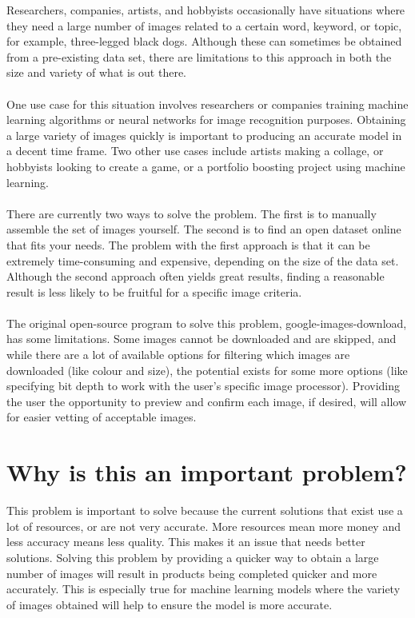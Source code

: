 \documentclass{article}
\begin{document}
Researchers, companies, artists, and hobbyists occasionally have situations where they need a large number of images related to a certain word, keyword, or topic, for example, three-legged black dogs. Although these can sometimes be obtained from a pre-existing data set, there are limitations to this approach in both the size and variety of what is out there.
\\\\One use case for this situation involves researchers or companies training machine learning algorithms or neural networks for image recognition purposes. Obtaining a large variety of images quickly is important to producing an accurate model in a decent time frame. Two other use cases include artists making a collage, or hobbyists looking to create a game, or a portfolio boosting project using machine learning.
\\\\There are currently two ways to solve the problem. The first is to manually assemble the set of images yourself. The second is to find an open dataset online that fits your needs. The problem with the first approach is that it can be extremely time-consuming and expensive, depending on the size of the data set. Although the second approach often yields great results, finding a reasonable result is less likely to be fruitful for a specific image criteria.
\\\\The original open-source program to solve this problem, google-images-download, has some limitations. Some images cannot be downloaded and are skipped, and while there are a lot of available options for filtering which images are downloaded (like colour and size), the potential exists for some more options (like specifying bit depth to work with the user’s specific image processor). Providing the user the opportunity to preview and confirm each image, if desired, will allow for easier vetting of acceptable images.


\section* {Why is this an important problem?}

This problem is important to solve because the current solutions that exist use a lot of resources, or are not very accurate. More resources mean more money and less accuracy means less quality. This makes it an issue that needs better solutions. Solving this problem by providing a quicker way to obtain a large number of images will result in products being completed quicker and more accurately. This is especially true for machine learning models where the variety of images obtained will help to ensure the model is more accurate.
\end{document}
